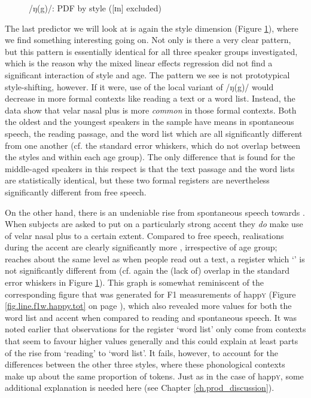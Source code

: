 \begin{figure}[h]
	\centering
		\resizebox{0.5\linewidth}{!}{} 
	\caption{/ŋ(g)/: PDF by style ([ɪn] excluded)}
	\label{fig.line.ng.tot}
\end{figure}

The last predictor we will look at is again the style dimension (Figure \ref{fig.line.ng.tot}), where we find something interesting going on.
Not only is there a very clear pattern, but this pattern is essentially identical for all three speaker groups investigated, which is the reason why the mixed linear effects regression did not find a significant interaction of style and age.
The pattern we see is not prototypical  style-shifting, however.
If it were, use of the local variant of /ŋ(g)/ would decrease in more formal contexts like reading a text or a word list.
Instead, the data show that velar nasal plus is more \emph{common} in those formal contexts.
Both the oldest and the youngest speakers in the sample have means in spontaneous speech, the reading passage, and the word list which are all significantly different from one another (cf. the standard error whiskers, which do not overlap between the styles and within each age group).
The only difference that is found for the middle-aged speakers in this respect is that the text passage and the word lists are statistically identical, but these two formal registers are nevertheless significantly different from free speech.

On the other hand, there is an undeniable rise from spontaneous speech towards .
When subjects are asked to put on a particularly strong  accent they \emph{do} make use of velar nasal plus to a certain extent.
Compared to free speech, realisations during the accent  are clearly significantly more , irrespective of age group;  reaches about the same level as when people read out a text, a register which `' is not significantly different from (cf. again the (lack of) overlap in the standard error whiskers in Figure \ref{fig.line.ng.tot}).
This graph is somewhat reminiscent of the corresponding figure that was generated for F1 measurements of happ\textsc{y} (Figure \ref{fig.line.f1w.happy.tot} on page \pageref{fig.line.f1w.happy.tot}), which also revealed more  values for both the word list and accent  when compared to reading and spontaneous speech.
It was noted earlier that observations for the register `word list' only come from contexts that seem to favour higher  values generally and this could explain at least parts of the rise from `reading' to `word list'.
It fails, however, to account for the differences between the other three styles, where these phonological contexts make up about the same proportion of tokens.
Just as in the case of happ\textsc{y}, some additional explanation is needed here (see Chapter \ref{ch.prod_discussion}).

